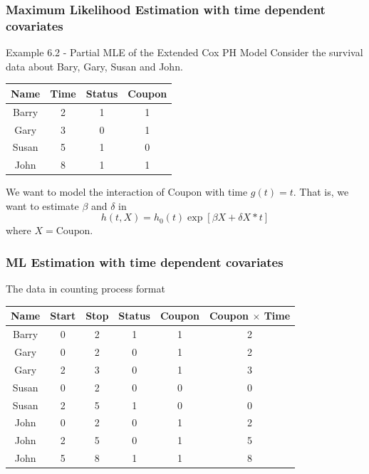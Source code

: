 \documentclass{beamer}
\theoremstyle{definition}
\begin{document}
\begin{frame}
\frametitle{Maximum Likelihood Estimation with time dependent covariates}
\begin{block}{Example 6.2 - Partial MLE of the Extended Cox PH Model}
Consider the survival data about Bary, Gary, Susan and John.
\begin{center}
\begin{tabular}{ c c c c } \hline
 Name & Time & Status & Coupon \\ \hline
Barry & 2 & 1 & 1 \\
 Gary & 3 & 0 & 1 \\
Susan & 5 & 1 & 0 \\
  John & 8 & 1 & 1 \\
\end{tabular}
\end{center}
\end{block}
We want to model the interaction of Coupon with time $g(t)=t$. That is, we want to estimate $\beta$ and $\delta$ in
\[
h(t,X) = h_0(t) \exp[\beta X+ \delta X *t]
\]
where $X=\text{Coupon}$.
\end{frame}

\begin{frame}
\frametitle{ML Estimation with time dependent covariates}
\begin{block}{The data in counting process format}
\begin{table}[]
\begin{tabular}{c c c c c c}
Name  & Start & Stop & Status & Coupon & Coupon $\times$ Time \\ \hline
Barry & 0     & 2    & 1      & 1      & 2                    \\
Gary  & 0     & 2    & 0      & 1      & 2                    \\
Gary  & 2     & 3    & 0      & 1      & 3                    \\
Susan & 0     & 2    & 0      & 0      & 0                    \\
Susan & 2     & 5    & 1      & 0      & 0                    \\
John  & 0     & 2    & 0      & 1      & 2                    \\
John  & 2     & 5    & 0      & 1      & 5                    \\
John  & 5     & 8    & 1      & 1      & 8
\end{tabular}
\end{table}
\end{block}
\end{frame}
\end{document}
